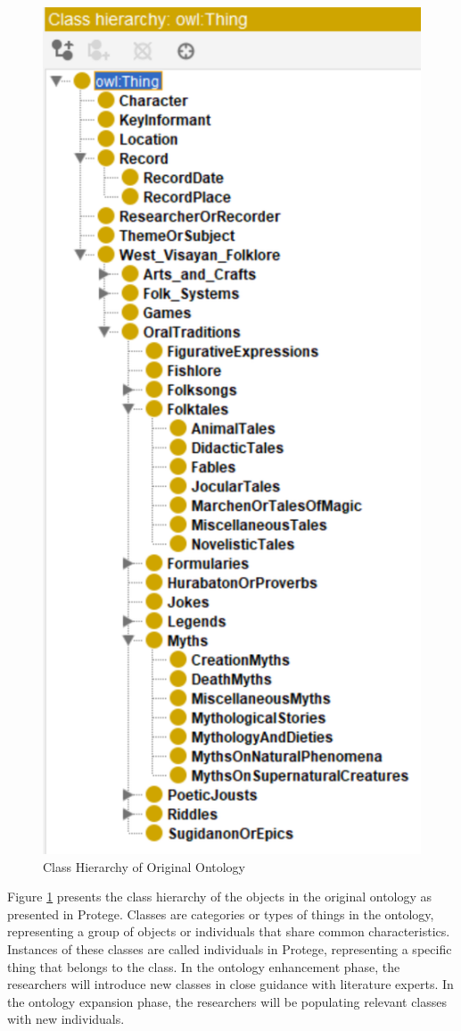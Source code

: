 \begin{figure}[H]
    \centering
    \includegraphics[width=0.5\linewidth]{figures/Class Hierarchy of Original Ontology.png}
    \caption{Class Hierarchy of Original Ontology}
    \label{fig:class hierarchy}
\end{figure}

Figure \ref{fig:class hierarchy} presents the class hierarchy of the objects in the original ontology as presented in Protege. Classes are categories or types of things in the ontology, representing a group of objects or individuals that share common characteristics. Instances of these classes are called individuals in Protege, representing a specific thing that belongs to the class. In the ontology enhancement phase, the researchers will introduce new classes in close guidance with literature experts. In the ontology expansion phase, the researchers will be populating relevant classes with new individuals.

